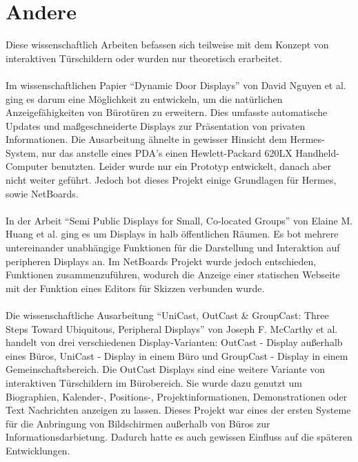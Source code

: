 \section{Andere}
Diese wissenschaftlich Arbeiten befassen sich teilweise mit dem Konzept von interaktiven Türschildern oder wurden nur theoretisch erarbeitet.
\\\\
Im wissenschaftlichen Papier ``Dynamic Door Displays'' von David Nguyen et al. ging es darum eine Möglichkeit zu entwickeln, um die natürlichen Anzeigefähigkeiten von Bürotüren zu erweitern. Dies umfasste automatische Updates und maßgeschneiderte Displays zur Präsentation von privaten Informationen\cite{nguyen:dyn-door-disp}. Die Ausarbeitung ähnelte in gewisser Hinsicht dem Hermes-System, nur das anstelle eines PDA's einen Hewlett-Packard 620LX Handheld-Computer benutzten.
Leider wurde nur ein Prototyp entwickelt, danach aber nicht weiter geführt. Jedoch bot dieses Projekt einige Grundlagen für Hermes, sowie NetBoards.
\\\\
In der Arbeit ``Semi Public Displays for Small, Co-located Groups'' von Elaine M. Huang et al. ging es um Displays in halb öffentlichen Räumen.  Es bot mehrere untereinander unabhängige Funktionen für die Darstellung und Interaktion auf peripheren Displays an. Im NetBoards Projekt wurde jedoch entschieden, Funktionen zusammenzuführen, wodurch \bspw die Anzeige einer statischen Webseite mit der Funktion eines Editors für Skizzen verbunden wurde.
\\\\
Die wissenschaftliche Ausarbeitung ``UniCast, OutCast \& GroupCast: Three Steps Toward Ubiquitous, Peripheral Displays'' von Joseph F. McCarthy et al. handelt von drei verschiedenen Display-Varianten: OutCast - Display außerhalb eines Büros, UniCast - Display in einem Büro und GroupCast - Display in einem Gemeinschaftsbereich\cite{mccarthy:2001}. Die OutCast Displays sind eine weitere Variante von interaktiven Türschildern im Bürobereich. Sie wurde dazu genutzt um Biographien, Kalender-, Positions-, Projektinformationen, Demonstrationen oder Text Nachrichten anzeigen zu lassen. Dieses Projekt war eines der ersten Systeme für die Anbringung von Bildschirmen außerhalb von Büros zur Informationsdarbietung. Dadurch hatte es auch gewissen Einfluss auf die späteren Entwicklungen.